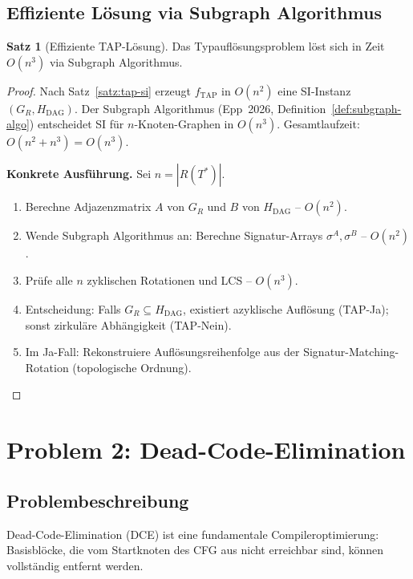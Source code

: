 ﻿\documentclass[a4paper,12pt]{article}
\theoremstyle{definition}
\newtheorem{satz}{Satz}
\begin{document}
\subsection{Effiziente Lösung via Subgraph Algorithmus}

\begin{satz}[Effiziente TAP-Lösung]
Das Typauflösungsproblem löst sich in Zeit $O(n^3)$ via Subgraph Algorithmus.
\end{satz}

\begin{proof}
Nach Satz~\ref{satz:tap-si} erzeugt $f_{\text{TAP}}$ in $O(n^2)$ eine SI-Instanz $(G_R, H_{\text{DAG}})$. Der Subgraph Algorithmus (Epp~2026, Definition~\ref{def:subgraph-algo}) entscheidet SI für $n$-Knoten-Graphen in $O(n^3)$. Gesamtlaufzeit: $O(n^2 + n^3) = O(n^3)$.

\textbf{Konkrete Ausführung.} Sei $n = |R(T^*)|$.
\begin{enumerate}
    \item Berechne Adjazenzmatrix $A$ von $G_R$ und $B$ von $H_{\text{DAG}}$ -- $O(n^2)$.
    \item Wende Subgraph Algorithmus an: Berechne Signatur-Arrays $\sigma^A, \sigma^B$ -- $O(n^2)$.
    \item Prüfe alle $n$ zyklischen Rotationen und LCS -- $O(n^3)$.
    \item Entscheidung: Falls $G_R \subseteq H_{\text{DAG}}$, existiert azyklische Auflösung (TAP-Ja); sonst zirkuläre Abhängigkeit (TAP-Nein).
    \item Im Ja-Fall: Rekonstruiere Auflösungsreihenfolge aus der Signatur-Matching-Rotation (topologische Ordnung).
\end{enumerate}
\end{proof}

\section{Problem 2: Dead-Code-Elimination}
\label{sec:dce}

\subsection{Problembeschreibung}

Dead-Code-Elimination (DCE) ist eine fundamentale Compileroptimierung: Basisblöcke, die vom Startknoten des CFG aus nicht erreichbar sind, können vollständig entfernt werden.
\end{document}
